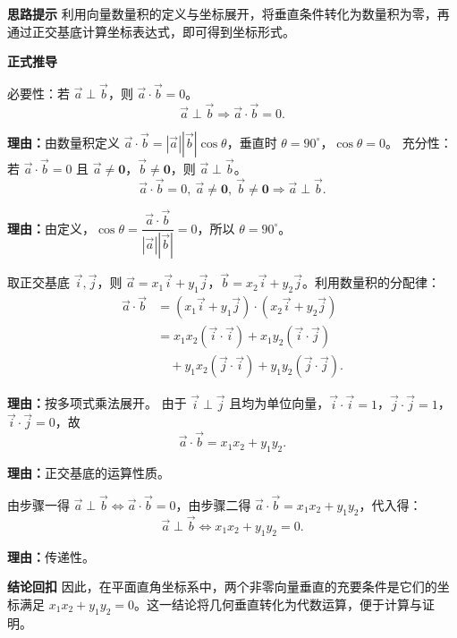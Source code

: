 \begin{proofbox}
	\textbf{\textcolor{CProof}{思路提示}}
	利用向量数量积的定义与坐标展开，将垂直条件转化为数量积为零，再通过正交基底计算坐标表达式，即可得到坐标形式。

	\medskip
	\textbf{\textcolor{CProof}{正式推导}}
	\begin{description}[style=nextline, leftmargin=2.8em, labelsep=0.5em, itemsep=0.55em]
		\item[\textbf{步骤一（垂直与数量积）：}]
			必要性：若 $\vec{a}\perp\vec{b}$，则 $\vec{a}\cdot\vec{b}=0$。
			\[
				\vec{a}\perp\vec{b} \Rightarrow \vec{a}\cdot\vec{b}=0.
			\]
			\par\textbf{理由：}由数量积定义 $\vec{a}\cdot\vec{b}=|\vec{a}||\vec{b}|\cos\theta$，垂直时 $\theta=90^\circ$，$\cos\theta=0$。 充分性：若 $\vec{a}\cdot\vec{b}=0$ 且 $\vec{a}\neq\mathbf{0}$，$\vec{b}\neq\mathbf{0}$，则 $\vec{a}\perp\vec{b}$。
			\[
				\vec{a}\cdot\vec{b}=0,\ \vec{a}\neq\mathbf{0},\ \vec{b}\neq\mathbf{0} \Rightarrow \vec{a}\perp\vec{b}.
			\]
			\par\textbf{理由：}由定义，$\cos\theta=\dfrac{\vec{a}\cdot\vec{b}}{|\vec{a}||\vec{b}|}=0$，所以 $\theta=90^\circ$。
		\item[\textbf{步骤二（坐标展开）：}]
			取正交基底 $\vec{i},\vec{j}$，则 $\vec{a}=x_1\vec{i}+y_1\vec{j}$，$\vec{b}=x_2\vec{i}+y_2\vec{j}$。利用数量积的分配律：
			\[
				\begin{aligned}
					\vec{a}\cdot\vec{b} &= (x_1\vec{i}+y_1\vec{j})\cdot(x_2\vec{i}+y_2\vec{j}) \\ &= x_1x_2(\vec{i}\cdot\vec{i}) + x_1y_2(\vec{i}\cdot\vec{j}) \\ &\quad + y_1x_2(\vec{j}\cdot\vec{i}) + y_1y_2(\vec{j}\cdot\vec{j}).
			\end{aligned}
			\]
			\par\textbf{理由：}按多项式乘法展开。 由于 $\vec{i}\perp\vec{j}$ 且均为单位向量，$\vec{i}\cdot\vec{i}=1$，$\vec{j}\cdot\vec{j}=1$，$\vec{i}\cdot\vec{j}=0$，故
			\[
				\vec{a}\cdot\vec{b}=x_1x_2+y_1y_2.
			\]
			\par\textbf{理由：}正交基底的运算性质。
		\item[\textbf{步骤三（合并结论）：}]
			由步骤一得 $\vec{a}\perp\vec{b} \iff \vec{a}\cdot\vec{b}=0$，由步骤二得 $\vec{a}\cdot\vec{b}=x_1x_2+y_1y_2$，代入得：
			\[
				\vec{a}\perp\vec{b} \iff x_1x_2+y_1y_2=0.
			\]
			\par\textbf{理由：}传递性。
	\end{description}

	\medskip
	\textbf{\textcolor{CProof}{结论回扣}}
	因此，在平面直角坐标系中，两个非零向量垂直的充要条件是它们的坐标满足 $x_1x_2+y_1y_2=0$。这一结论将几何垂直转化为代数运算，便于计算与证明。
\end{proofbox}
